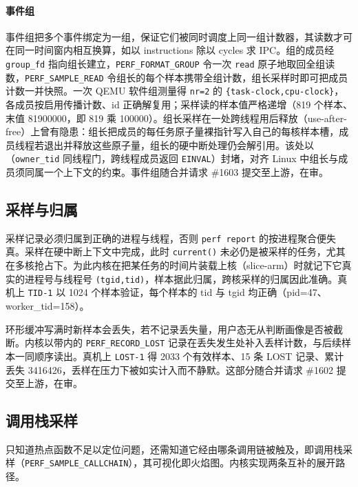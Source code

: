 \paragraph{事件组}
事件组把多个事件绑定为一组，保证它们被同时调度上同一组计数器，其读数才可在同一时间窗内相互换算，如以 instructions 除以 cycles 求 IPC。组的成员经 \texttt{group\_fd} 指向组长建立，\texttt{PERF\_FORMAT\_GROUP} 令一次 \texttt{read} 原子地取回全组读数，\texttt{PERF\_SAMPLE\_READ} 令组长的每个样本携带全组计数，组长采样时即可把成员计数一并快照。一次 QEMU 软件组测量得 \texttt{nr=2} 的 \texttt{\{task-clock,cpu-clock\}}，各成员按启用传播计数、id 正确解复用；采样读的样本值严格递增（819 个样本、末值 81900000，即 819 乘 100000）。组长采样在一处跨线程用后释放（use-after-free）上曾有隐患：组长把成员的每任务原子量裸指针写入自己的每核样本槽，成员线程若退出并释放这些原子量，组长的硬中断处理仍会解引用。该处以（\texttt{owner\_tid} 同线程门，跨线程成员返回 \texttt{EINVAL}）封堵，对齐 Linux 中组长与成员须同属一个上下文的约束。事件组随合并请求 \#1603 提交至上游，在审。

\subsection{采样与归属}

采样记录必须归属到正确的进程与线程，否则 \texttt{perf report} 的按进程聚合便失真。采样在硬中断上下文中完成，此时 \texttt{current()} 未必仍是被采样的任务，尤其在多核抢占下。为此内核在把某任务的时间片装载上核（slice-arm）时就记下它真实的进程号与线程号 \texttt{(tgid,tid)}，样本据此归属，跨核采样的归属因此准确。真机上 \texttt{TID-1} 以 1024 个样本验证，每个样本的 tid 与 tgid 均正确（pid=47、worker\_tid=158）。

环形缓冲写满时新样本会丢失，若不记录丢失量，用户态无从判断画像是否被截断。内核以带内的 \texttt{PERF\_RECORD\_LOST} 记录在丢失发生处补入丢样计数，与后续样本一同顺序读出。真机上 \texttt{LOST-1} 得 2033 个有效样本、15 条 LOST 记录、累计丢失 3416426，丢样在压力下被如实计入而不静默。这部分随合并请求 \#1602 提交至上游，在审。

\subsection{调用栈采样}

只知道热点函数不足以定位问题，还需知道它经由哪条调用链被触及，即调用栈采样（\texttt{PERF\_SAMPLE\_CALLCHAIN}），其可视化即火焰图。内核实现两条互补的展开路径。

